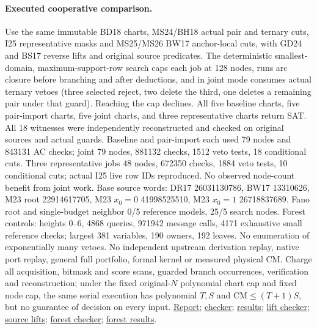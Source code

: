 \documentclass[11pt]{article}
\begin{document}
\paragraph{Executed cooperative comparison.}
Use the same immutable BD18 charts, MS24/BH18 actual pair and ternary cuts, I25 representative masks and MS25/MS26 BW17 anchor-local cuts, with GD24 and BS17 reverse lifts and original source predicates. The deterministic smallest-domain, maximum-support-row search caps each job at 128 nodes, runs arc closure before branching and after deductions, and in joint mode consumes actual ternary vetoes (three selected reject, two delete the third, one deletes a remaining pair under that guard). Reaching the cap declines. All five baseline charts, five pair-import charts, five joint charts, and three representative charts return SAT. All 18 witnesses were independently reconstructed and checked on original sources and actual guards. Baseline and pair-import each used 79 nodes and 843131 AC checks; joint 79 nodes, 881132 checks, 1512 veto tests, 18 conditional cuts. Three representative jobs 48 nodes, 672350 checks, 1884 veto tests, 10 conditional cuts; actual I25 live row IDs reproduced. No observed node-count benefit from joint work. Base source words: DR17 26031130786, BW17 13310626, M23 root 22914617705, M23 $x_0=0$ 41998525510, M23 $x_0=1$ 26718837689. Fano root and single-budget neighbor 0/5 reference models, 25/5 search nodes. Forest controls: heights 0--6, 4868 queries, 971942 message calls, 4171 exhaustive small reference checks; largest 381 variables, 190 owners, 192 leaves. No enumeration of exponentially many vetoes. No independent upstream derivation replay, native port replay, general full portfolio, formal kernel or measured physical CM. Charge all acquisition, bitmask and score scans, guarded branch occurrences, verification and reconstruction; under the fixed original-$N$ polynomial chart cap and fixed node cap, the same serial execution has polynomial $T,S$ and $\mathrm{CM}\le(T+1)S$, but no guarantee of decision on every input. \href{https://github.com/j15marti/pnp/commit/6f4d82b993399abee66b54faa2d25c16f5b56f34}{Report}; \href{https://github.com/j15marti/pnp/commit/213c9247416aa87e77974b3eac12592ef8fe6284}{checker}; \href{https://github.com/j15marti/pnp/commit/78f6e70d134a512333889b70cfd53908ca4f8f05}{results}; \href{https://github.com/j15marti/pnp/commit/b7841b640353f2a30a20a4be40e8fa4257882af7}{lift checker}; \href{https://github.com/j15marti/pnp/commit/fefc22e40f9ad0b72fdda1ad43ca37c2188f6e75}{source lifts}; \href{https://github.com/j15marti/pnp/commit/0b29fd56a734ef8bce1f78e210c643b44df88468}{forest checker}; \href{https://github.com/j15marti/pnp/commit/0757da7ba34d5dd49d50795c49a6477f31849f10}{forest results}.
\end{document}
